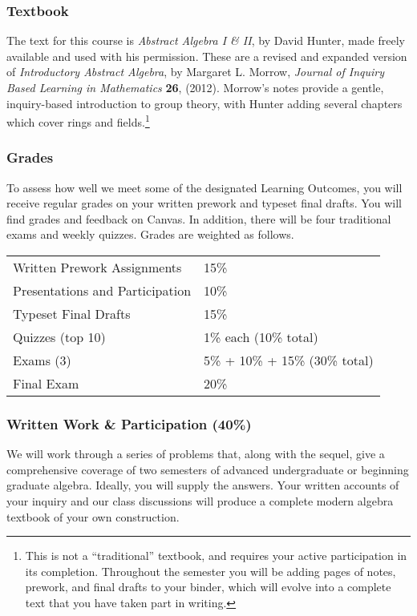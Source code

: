 \documentclass[
  twoside]{article}
\begin{document}
\subsubsection{Textbook}\label{textbook}

The text for this course is \emph{Abstract Algebra I \& II}, by David
Hunter, made freely available and used with his permission. These are a
revised and expanded version of \emph{Introductory Abstract Algebra}, by
Margaret L. Morrow, \emph{Journal of Inquiry Based Learning in
Mathematics} \textbf{26}, (2012). Morrow's notes provide a gentle,
inquiry-based introduction to group theory, with Hunter adding several
chapters which cover rings and fields.\footnote{This is not a
  ``traditional'' textbook, and requires your active participation in
  its completion. Throughout the semester you will be adding pages of
  notes, prework, and final drafts to your binder, which will evolve
  into a complete text that you have taken part in writing.}

\subsubsection{Grades}\label{grades}

To assess how well we meet some of the designated Learning Outcomes, you
will receive regular grades on your written prework and typeset final
drafts. You will find grades and feedback on Canvas. In addition, there
will be four traditional exams and weekly quizzes. Grades are weighted
as follows.

\begin{tabular}[t]{ll}
\toprule
Written Prework Assignments & 15\%\\
Presentations and Participation & 10\%\\
Typeset Final Drafts & 15\%\\
Quizzes (top 10) & 1\% each (10\% total)\\
Exams (3) & 5\% + 10\% + 15\% (30\% total)\\
\addlinespace
Final Exam & 20\%\\
\bottomrule
\end{tabular}

\subsubsection{Written Work \& Participation
(40\%)}\label{written-work-participation-40}

We will work through a series of problems that, along with the sequel,
give a comprehensive coverage of two semesters of advanced undergraduate
or beginning graduate algebra. Ideally, you will supply the answers.
Your written accounts of your inquiry and our class discussions will
produce a complete modern algebra textbook of your own construction.
\end{document}
